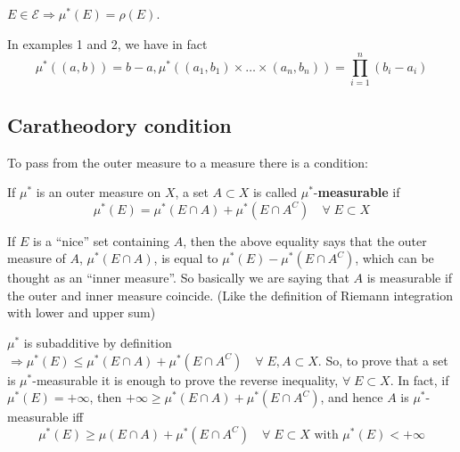 \begin{remark}
    \(E \in \mathcal{E} \Rightarrow \mu^*(E) = \rho(E)\).  

    In examples 1 and 2, we have in fact 
    \[
        \mu^*((a,b)) = b-a, \mu^*\left((a_1, b_1) \times \ldots \times (a_n, b_n)\right) = \prod_{i=1}^{n} (b_i - a_i)
    \] 
\end{remark}
\subsection{Caratheodory condition}
To pass from the outer measure to a measure there is a condition: 
\begin{definition}
    If \(\mu^*\) is an outer measure on \(X\), a set \(A \subset X\) is called \(\mu^*\)-\textbf{measurable} if 
    \[
        \mu^*(E) = \mu^*(E \cap A) + \mu^*(E \cap A^C) \quad \forall \; E \subset X
    \]
\end{definition}
\begin{remark}
    If \(E\) is a ``nice'' set containing \(A\), then the above equality says that the outer measure of \(A\), \(\mu^*(E \cap A)\), is equal to \(\mu^*(E) - \mu^*(E \cap A^C)\), which can be thought as an ``inner measure''. So basically we are saying that \(A\) is measurable if the outer and inner measure coincide. (Like the definition of Riemann integration with lower and upper sum)
\end{remark}
\begin{remark}
    \(\mu^*\) is subadditive by definition \(\Rightarrow \mu^*(E) \leq \mu^*(E \cap A) + \mu^*(E \cap A^C) \quad \forall \; E, A \subset X\).  
    So, to prove that a set is \(\mu^*\)-measurable it is enough to prove the reverse inequality, \(\forall \; E \subset X\). In fact, if \(\mu^*(E) = +\infty\), then \(+\infty \geq \mu^*(E \cap A) + \mu^*(E \cap A^C)\), and hence \(A\) is \(\mu^*\)-measurable iff 
    \[
        \mu^*(E) \geq \mu(E \cap A) + \mu^*(E \cap A^C) \quad \forall \; E \subset X \mbox{ with } \mu^*(E) < +\infty
    \] 
\end{remark}
